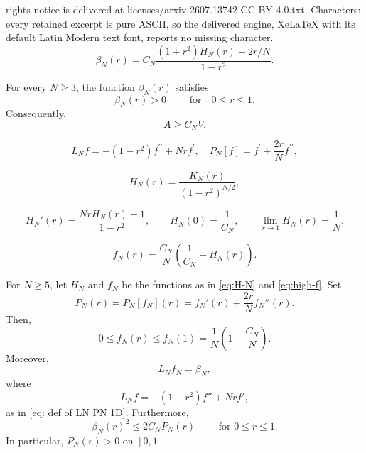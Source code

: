 \documentclass[10pt,a4paper]{amsart}
\begin{document}
rights notice is delivered at licenses/arxiv-2607.13742-CC-BY-4.0.txt. Characters: every retained excerpt is pure ASCII, so the delivered engine, XeLaTeX with its default Latin Modern text font, reports no missing character.
\begin{equation}\label{eq:beta-via-H}
 \beta_N(r)=C_N\frac{(1+r^2)H_N(r)-2r/N}{1-r^2}.
\end{equation}

\begin{lemma}\label{lem:beta-positive}
For every $N\ge3$, the function $\beta_N(r)$ satisfies
\[
 \beta_N(r)>0\qquad \text{ for}\quad  0\le r\le1.
\]
Consequently,
\begin{equation}\label{eq:reverse-bridge-general}
 A\ge C_NV.
\end{equation}
\end{lemma}

\begin{equation}\label{eq: def of LN PN 1D}
L_N f=-\left(1-r^2\right) f^{\prime \prime}+N r f^{\prime}, \quad P_N[f]=f^{\prime}+\frac{2 r}{N} f^{\prime \prime},
\end{equation}

\begin{equation}\label{eq:H-N}
 H_N(r)=\frac{K_N(r)}{(1-r^2)^{N/2}},
\end{equation}

\begin{equation}\label{eq:H-ODE}
 H_N'(r)=\frac{NrH_N(r)-1}{1-r^2},
 \qquad
 H_N(0)=\frac1{C_N},
 \qquad
 \lim_{r\to1}H_N(r)=\frac1N.
\end{equation}

\begin{equation}\label{eq:high-f}
 f_N(r)=\frac{C_N}{N}\left(\frac1{C_N}-H_N(r)\right).
\end{equation}

\begin{lemma}\label{lem:high-1D}
For $N\ge5$, let $H_N$ and $f_N$ be the functions as in \eqref{eq:H-N} and \eqref{eq:high-f}. Set
\begin{equation}\label{eq:calP-def}
 P_N(r)=P_N\left[f_N\right](r)=f_N'(r)+\frac{2r}{N}f_N''(r).
\end{equation}
Then,
\begin{equation}\label{eq:high-f-bounds}
 0\le f_N(r)\le f_N(1)=\frac1N\left(1-\frac{C_N}{N}\right).
\end{equation}
Moreover, 
\begin{equation}\label{eq:high-Lf}
 L_Nf_N=\beta_N,
\end{equation}
where 
\[
 L_Nf=-(1-r^2)f''+Nrf',
\]
as in \eqref{eq: def of LN PN 1D}.
Furthermore, 
\begin{equation}\label{eq:high-pointwise}
\beta_N(r)^2\le2C_NP_N(r)\qquad \text{ for } 0\le r\le1.
\end{equation}
In particular, $P_N(r)>0$ on $[0,1]$.
\end{lemma}
\end{document}
